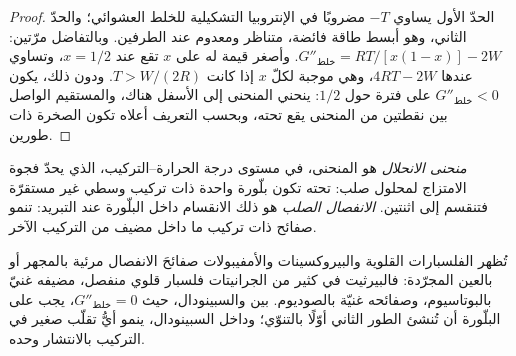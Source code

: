 \begin{proof}
الحدّ الأول يساوي $-T$ مضروبًا في الإنتروبيا التشكيلية للخلط العشوائي؛
والحدّ الثاني، وهو أبسط طاقة فائضة، متناظر ومعدوم عند الطرفين.
وبالتفاضل مرّتين: $G''_{\text{خلط}} = RT/[x(1 - x)] - 2W$. وأصغر قيمة له
على $x$ تقع عند $x = 1/2$، وتساوي عندها $4RT - 2W$، وهي موجبة لكلّ
$x$ إذا كانت $T > W/(2R)$. ودون ذلك، يكون $G''_{\text{خلط}} < 0$ على فترة
حول $1/2$: ينحني المنحنى إلى الأسفل هناك، والمستقيم الواصل بين نقطتين
من المنحنى يقع تحته، وبحسب التعريف أعلاه تكون الصخرة
ذات طورين.
\end{proof}

\begin{definition}\label{def:b3:petrological-thermodynamics:solvus}
\emph{منحنى الانحلال} هو المنحنى، في مستوى درجة الحرارة--التركيب،
الذي يحدّ فجوة الامتزاج لمحلول صلب: تحته تكون بلّورة واحدة ذات تركيب وسطي
غير مستقرّة فتنقسم إلى اثنتين.
\emph{الانفصال الصلب} هو ذلك الانقسام
داخل البلّورة عند التبريد: تنمو صفائح ذات تركيب ما داخل مضيف
من التركيب الآخر.
\end{definition}

تُظهر الفلسبارات القلوية والبيروكسينات والأمفيبولات صفائحَ الانفصال
مرئية بالمجهر أو بالعين المجرّدة: فالبيرثيت في كثير من الجرانيتات
فلسبار قلوي منفصل، مضيفه غنيّ بالبوتاسيوم، وصفائحه غنيّة بالصوديوم.
بين  والسبينودال، حيث $G''_{\text{خلط}} = 0$،
يجب على البلّورة أن تُنشئ الطور الثاني أوّلًا بالتنوّي؛ وداخل السبينودال،
ينمو أيُّ تقلّب صغير في التركيب بالانتشار وحده.

